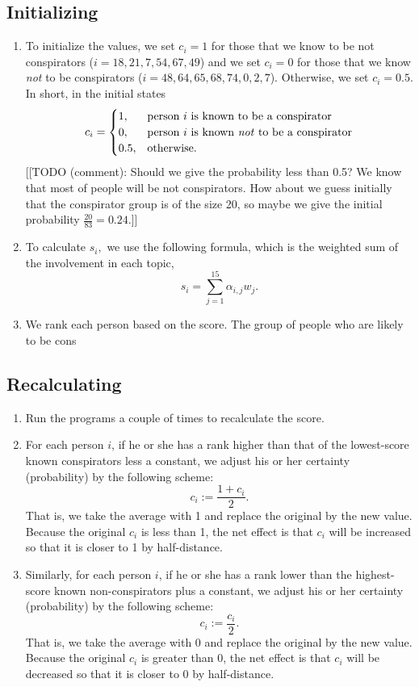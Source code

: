 \documentclass{icmmcm}
\begin{document}
\subsection{Initializing}
\begin{enumerate}
\item To initialize the values, we set $c_i = 1$ for those that
we know to be not conspirators ($i=18,21,7,54,67,49$)
and we set $c_i = 0$ for those that
we know \textit{not} to be conspirators ($i=48,64,65,68,74,0,2,7$).
Otherwise, we set $c_i = 0.5.$ In short, in the initial states
\[c_i=
\begin{cases}
1,	& \text{person $i$ is known to be a conspirator}\\
0,	& \text{person $i$ is known \textit{not} to be a conspirator}\\
0.5,	&\text{otherwise.}
\end{cases}\]
[[TODO (comment): Should we give the probability less than 0.5?
We know that most of people will be not conspirators. 
How about we guess initially that the conspirator group 
is of the size 20, so maybe we give the initial probability
$\frac{20}{83}  = 0.24$.]]

\item To calculate $s_i,$ we use the following formula,
which is the weighted sum of the involvement in each topic,
\[s_i = \sum_{j=1}^{15} \alpha_{i,j} w_j.\]

\item We rank each person based on the score.
The group of people who are likely to be 
cons
\end{enumerate}

\subsection{Recalculating}
\begin{enumerate}

\item Run the programs a couple of times to recalculate
the score.

\item For each person $i$,
if he or she has a 
rank higher than that of the lowest-score known conspirators less a constant,
we adjust his or her certainty (probability) by the following scheme:
\[c_i := \frac{1 + c_i}{2}.\]
That is, we take the average with 1 and replace the original by the new value. 
Because the original $c_i$ is less than 1, the net effect is that
$c_i$ will be increased so that it is closer to 1 by half-distance.

\item Similarly,
for each person $i$,
if he or she has a 
rank lower than the highest-score known non-conspirators plus a constant,
we adjust his or her certainty (probability) by the following scheme:
\[c_i := \frac{c_i}{2}.\]
That is, we take the average with 0 and replace the original by the new value. 
Because the original $c_i$ is greater than 0, the net effect is that
$c_i$ will be decreased so that it is closer to 0 by half-distance.

\end{enumerate}
\end{document}

